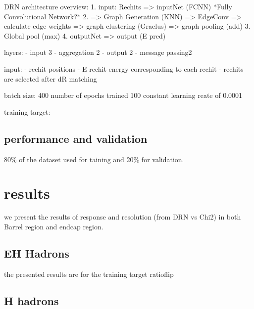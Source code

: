 DRN architecture overview:
1. input: Rechits => inputNet (FCNN) *Fully Convolutional Network?*
2. => Graph Generation (KNN) => EdgeConv => calculate edge weights => graph clustering (Graclus) => graph pooling (add)
3. Global pool (max)
4. outputNet => output (E pred)

layers:
- input 3
- aggregation 2
- output 2
- message passing2 

input:
- rechit positions
- E rechit energy corresponding to each rechit
- rechits are selected after dR matching %

batch size: 400
number of epochs trained 100
constant learning reate of 0.0001

training target:

\subsection{performance and validation}
80\% of the dataset used for taining and 20\% for validation.

\section{results}
we present the results of response and resolution (from DRN vs Chi2) in  both Barrel region and endcap region.

\subsection{EH Hadrons}
the presented results are for the training target ratioflip



\subsection{H hadrons}
